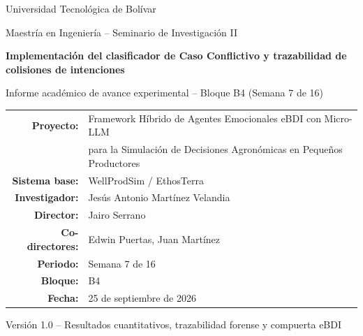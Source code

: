 \documentclass[11pt,a4paper]{article}
\begin{document}
\begin{titlepage}
    \centering
    \vspace*{1.5cm}

    {\large Universidad Tecnológica de Bolívar\par}
    \vspace{0.3cm}
    {\normalsize Maestría en Ingeniería -- Seminario de Investigación II\par}

    \vspace{2.2cm}
    {\LARGE\bfseries Implementación del clasificador de Caso Conflictivo y trazabilidad de colisiones de intenciones\par}
    \vspace{0.5cm}
    {\large Informe académico de avance experimental -- Bloque B4 (Semana 7 de 16)\par}

    \vspace{2.2cm}
    \begin{tabular}{rl}
        \textbf{Proyecto:} & Framework Híbrido de Agentes Emocionales eBDI con Micro-LLM \\
                           & para la Simulación de Decisiones Agronómicas en Pequeños Productores \\
        \textbf{Sistema base:} & WellProdSim / EthosTerra \\
        \textbf{Investigador:} & Jesús Antonio Martínez Velandia \\
        \textbf{Director:} & Jairo Serrano \\
        \textbf{Co-directores:} & Edwin Puertas, Juan Martínez \\
        \textbf{Periodo:} & Semana 7 de 16 \\
        \textbf{Bloque:} & B4 \\
        \textbf{Fecha:} & 25 de septiembre de 2026 \\
    \end{tabular}

    \vfill
    {\small Versión 1.0 -- Resultados cuantitativos, trazabilidad forense y compuerta eBDI\par}
    \vspace*{1cm}
\end{titlepage}

\newpage
\tableofcontents
\newpage
\end{document}
